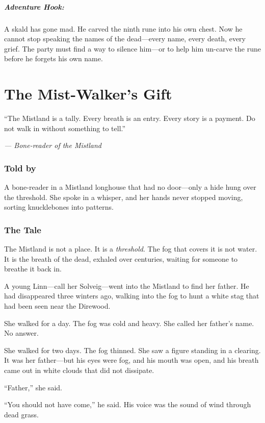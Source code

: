 \documentclass[9pt,a5paper]{extbook}
\begin{document}
\paragraph{Adventure Hook:}
A skald has gone mad. He carved the ninth rune into his own chest. Now he cannot stop speaking the names of the dead---every name, every death, every grief. The party must find a way to silence him---or to help him un-carve the rune before he forgets his own name.

\clearpage

\chapter{The Mist-Walker's Gift}

\epigraph{``The Mistland is a tally. Every breath is an entry. Every story is a payment. Do not walk in without something to tell.''}{\textit{--- Bone-reader of the Mistland}}

\subsection*{Told by}

A bone-reader in a Mistland longhouse that had no door---only a hide hung over the threshold. She spoke in a whisper, and her hands never stopped moving, sorting knucklebones into patterns.

\subsection*{The Tale}

The Mistland is not a place. It is a \textit{threshold}. The fog that covers it is not water. It is the breath of the dead, exhaled over centuries, waiting for someone to breathe it back in.

A young Linn---call her Solveig---went into the Mistland to find her father. He had disappeared three winters ago, walking into the fog to hunt a white stag that had been seen near the Direwood.

She walked for a day. The fog was cold and heavy. She called her father's name. No answer.

She walked for two days. The fog thinned. She saw a figure standing in a clearing. It was her father---but his eyes were fog, and his mouth was open, and his breath came out in white clouds that did not dissipate.

``Father,'' she said.

``You should not have come,'' he said. His voice was the sound of wind through dead grass.
\end{document}
